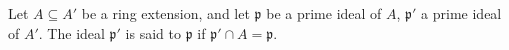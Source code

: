 Let $A \subseteq A'$ be a ring extension, and let $\mathfrak{p}$ be a prime ideal of $A$, $\mathfrak{p}'$ a prime ideal of $A'$. The ideal $\mathfrak{p}'$ is said to  $\mathfrak{p}$ if $\mathfrak{p}' \cap A = \mathfrak{p}$.

